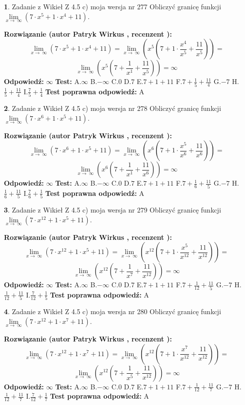 \documentclass[12pt, a4paper]{article}
\theoremstyle{definition} %
\newtheorem{zad}{}
\newcommand{\zadStart}[1]{\begin{zad}#1\newline}
\newcommand{\zadStop}{\end{zad}}
\newcommand{\rozwStart}[2]{\noindent \textbf{Rozwiązanie (autor #1 , recenzent #2): }\newline}
\newcommand{\rozwStop}{\newline}
\newcommand{\odpStart}{\noindent \textbf{Odpowiedź:}\newline}
\newcommand{\odpStop}{\newline}
\newcommand{\testStart}{\noindent \textbf{Test:}\newline}
\newcommand{\testStop}{\newline}
\newcommand{\kluczStart}{\noindent \textbf{Test poprawna odpowiedź:}\newline}
\newcommand{\kluczStop}{\newline}
\begin{document}
\zadStart{Zadanie z Wikieł Z 4.5 c) moja wersja nr 277}
Obliczyć granicę funkcji  $\lim\limits_{x\to\ \infty}(7 \cdot x^{5}+1 \cdot x^{4}+11)$.
\zadStop
\rozwStart{Patryk Wirkus}{}
$$\lim\limits_{x\to\ \infty}(7 \cdot x^{5}+1 \cdot x^{4}+11) = \lim\limits_{x\to\ \infty}(x^{5}(7 +1 \cdot \frac{x^{4}}{x^{5}}+\frac{11}{x^{5}})) =$$ $$\lim\limits_{x\to\ \infty}(x^{5}(7 +\frac{1}{x^{1}}+\frac{11}{x^{5}})) =\infty$$
\rozwStop
\odpStart
$\infty$
\odpStop
\testStart
A.$\infty$ B.$-\infty$ C.$0$ D.$7$ E.$7 + 1 + 11$
F.$7+\frac{1}{5}+\frac{11}{4}$ G.$-7$
H.$\frac{1}{5}+\frac{11}{4}$
I.$\frac{7}{5}+\frac{1}{4}$
\testStop
\kluczStart
A
\kluczStop



\zadStart{Zadanie z Wikieł Z 4.5 c) moja wersja nr 278}
Obliczyć granicę funkcji  $\lim\limits_{x\to\ \infty}(7 \cdot x^{6}+1 \cdot x^{5}+11)$.
\zadStop
\rozwStart{Patryk Wirkus}{}
$$\lim\limits_{x\to\ \infty}(7 \cdot x^{6}+1 \cdot x^{5}+11) = \lim\limits_{x\to\ \infty}(x^{6}(7 +1 \cdot \frac{x^{5}}{x^{6}}+\frac{11}{x^{6}})) =$$ $$\lim\limits_{x\to\ \infty}(x^{6}(7 +\frac{1}{x^{1}}+\frac{11}{x^{6}})) =\infty$$
\rozwStop
\odpStart
$\infty$
\odpStop
\testStart
A.$\infty$ B.$-\infty$ C.$0$ D.$7$ E.$7 + 1 + 11$
F.$7+\frac{1}{6}+\frac{11}{5}$ G.$-7$
H.$\frac{1}{6}+\frac{11}{5}$
I.$\frac{7}{6}+\frac{1}{5}$
\testStop
\kluczStart
A
\kluczStop



\zadStart{Zadanie z Wikieł Z 4.5 c) moja wersja nr 279}
Obliczyć granicę funkcji  $\lim\limits_{x\to\ \infty}(7 \cdot x^{12}+1 \cdot x^{5}+11)$.
\zadStop
\rozwStart{Patryk Wirkus}{}
$$\lim\limits_{x\to\ \infty}(7 \cdot x^{12}+1 \cdot x^{5}+11) = \lim\limits_{x\to\ \infty}(x^{12}(7 +1 \cdot \frac{x^{5}}{x^{12}}+\frac{11}{x^{12}})) =$$ $$\lim\limits_{x\to\ \infty}(x^{12}(7 +\frac{1}{x^{7}}+\frac{11}{x^{12}})) =\infty$$
\rozwStop
\odpStart
$\infty$
\odpStop
\testStart
A.$\infty$ B.$-\infty$ C.$0$ D.$7$ E.$7 + 1 + 11$
F.$7+\frac{1}{12}+\frac{11}{5}$ G.$-7$
H.$\frac{1}{12}+\frac{11}{5}$
I.$\frac{7}{12}+\frac{1}{5}$
\testStop
\kluczStart
A
\kluczStop



\zadStart{Zadanie z Wikieł Z 4.5 c) moja wersja nr 280}
Obliczyć granicę funkcji  $\lim\limits_{x\to\ \infty}(7 \cdot x^{12}+1 \cdot x^{7}+11)$.
\zadStop
\rozwStart{Patryk Wirkus}{}
$$\lim\limits_{x\to\ \infty}(7 \cdot x^{12}+1 \cdot x^{7}+11) = \lim\limits_{x\to\ \infty}(x^{12}(7 +1 \cdot \frac{x^{7}}{x^{12}}+\frac{11}{x^{12}})) =$$ $$\lim\limits_{x\to\ \infty}(x^{12}(7 +\frac{1}{x^{5}}+\frac{11}{x^{12}})) =\infty$$
\rozwStop
\odpStart
$\infty$
\odpStop
\testStart
A.$\infty$ B.$-\infty$ C.$0$ D.$7$ E.$7 + 1 + 11$
F.$7+\frac{1}{12}+\frac{11}{7}$ G.$-7$
H.$\frac{1}{12}+\frac{11}{7}$
I.$\frac{7}{12}+\frac{1}{7}$
\testStop
\kluczStart
A
\kluczStop
\end{document}
